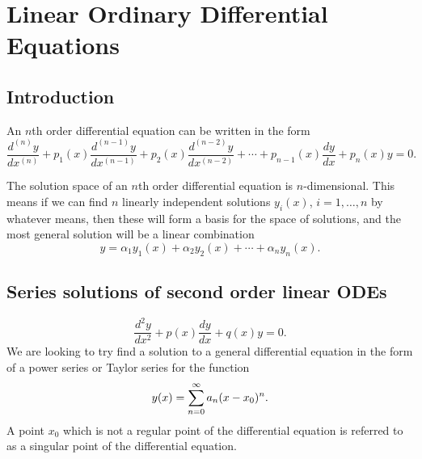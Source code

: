 \documentclass[10pt, a4paper]{article}
\begin{document}
\newpage

\section{Linear Ordinary Differential Equations}

\subsection{Introduction}
An $n$th order differential equation can be written in the form
\[
\frac{d ^ {(n)}y}{dx ^ {(n)}} + p_1(x)\frac{d ^ {(n - 1)}y}{dx ^ {(n - 1)}} + p_2(x)\frac{d ^ {(n - 2)}y}{dx ^ {(n - 2)}} + \dotsi + p_{n - 1}(x)\frac{dy}{dx} + p_n(x)y = 0.
\]

The solution space of an $n$th order differential equation is $n$-dimensional.
This means if we can find $n$ linearly independent solutions $y_i(x)$,
$i = 1, \dotsc, n$ by whatever means,
then these will form a basis for the space of solutions,
and the most general solution will be a linear combination
\[
y = \alpha_1y_1(x) + \alpha_2y_2(x) + \dotsi + \alpha_ny_n(x).
\]

\subsection{Series solutions of second order linear ODEs}
\[
\frac{d ^ 2y}{dx ^ 2} + p(x)\frac{dy}{dx} + q(x)y = 0.
\]
We are looking to try find a solution to a general differential equation in the form of a power series or Taylor series for the function
\[
y(x) = \infsum[n = 0] a_n(x - x_0) ^ n.
\]
A point $x_0$ which is not a regular point of the differential equation is referred to as a singular point of the differential equation.
\end{document}

